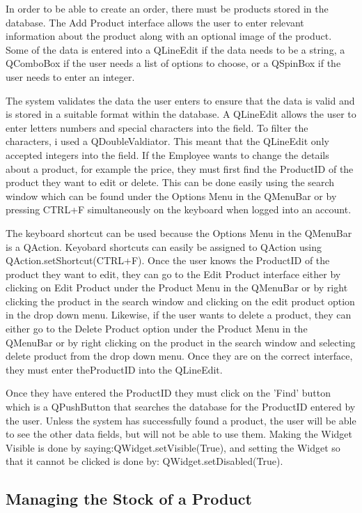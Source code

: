 In order to be able to create an order, there must be products stored in the database. The Add Product interface allows the user to enter relevant information about the product along with an optional image of the product. Some of the data is entered into a QLineEdit if the data needs to be a string, a QComboBox if the user needs a list of options to choose, or a QSpinBox if the user needs to enter an integer. 

The system validates the data the user enters to ensure that the data is valid and is stored in a suitable format within the database. A QLineEdit allows the user to enter letters numbers and special characters into the field. To filter the characters, i used a QDoubleValdiator. This meant that the QLineEdit only accepted integers into the field. If the Employee wants to change the details about a product, for example the price, they must first find the ProductID of the product they want to edit or delete. This can be done easily using the search window which can be found under the Options Menu in the QMenuBar or by pressing CTRL+F simultaneously on the keyboard when logged into an account. 

The keyboard shortcut can be used because the Options Menu in the QMenuBar is a QAction. Keyobard shortcuts can easily be assigned to QAction using QAction.setShortcut(CTRL+F). Once the user knows the ProductID of the product they want to edit, they can go to the Edit Product interface either by clicking on Edit Product under the Product Menu in the QMenuBar or by right clicking the product in the search window and clicking on the edit product option in the drop down menu. Likewise, if the user wants to delete a product, they can either go to the Delete Product option under the Product Menu in the QMenuBar or by right clicking on the product in the search window and selecting delete product from the drop down menu. Once they are on the correct interface, they must enter theProductID into the QLineEdit.

Once they have entered the ProductID they must click on the 'Find' button which is a QPushButton that searches the database for the ProductID entered by the user. Unless the system has successfully found a product, the user will be able to see the other data fields, but will not be able to use them. Making the Widget Visible is done by saying:QWidget.setVisible(True), and setting the Widget so that it cannot be clicked is done by:  QWidget.setDisabled(True).

\subsection{Managing the Stock of a Product}

